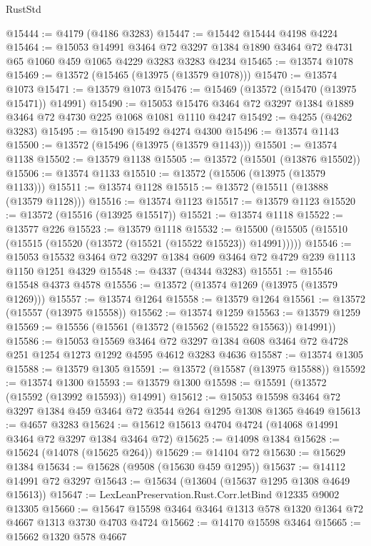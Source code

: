 \begin{lexlean}{RustStd}
\begin{coremodule}
@15444 := @4179 (@4186 @3283)
@15447 := @15442 @15444 @4198 @4224
@15464 := @15053
    @14991
    @3464
    @72
    @3297
    @1384
    @1890
    @3464
    @72
    @4731
    @65
    @1060
    @459
    @1065
    @4229
    @3283
    @3283
    @4234
@15465 := @13574 @1078
@15469 := @13572 (@15465 (@13975 (@13579 @1078)))
@15470 := @13574 @1073
@15471 := @13579 @1073
@15476 := @15469 (@13572 (@15470 (@13975 @15471)) @14991)
@15490 := @15053 @15476 @3464 @72 @3297 @1384 @1889 @3464 @72 @4730 @225 @1068 @1081 @1110 @4247
@15492 := @4255 (@4262 @3283)
@15495 := @15490 @15492 @4274 @4300
@15496 := @13574 @1143
@15500 := @13572 (@15496 (@13975 (@13579 @1143)))
@15501 := @13574 @1138
@15502 := @13579 @1138
@15505 := @13572 (@15501 (@13876 @15502))
@15506 := @13574 @1133
@15510 := @13572 (@15506 (@13975 (@13579 @1133)))
@15511 := @13574 @1128
@15515 := @13572 (@15511 (@13888 (@13579 @1128)))
@15516 := @13574 @1123
@15517 := @13579 @1123
@15520 := @13572 (@15516 (@13925 @15517))
@15521 := @13574 @1118
@15522 := @13577 @226
@15523 := @13579 @1118
@15532 := @15500 (@15505 (@15510 (@15515 (@15520 (@13572 (@15521 (@15522 @15523)) @14991)))))
@15546 := @15053 @15532 @3464 @72 @3297 @1384 @609 @3464 @72 @4729 @239 @1113 @1150 @1251 @4329
@15548 := @4337 (@4344 @3283)
@15551 := @15546 @15548 @4373 @4578
@15556 := @13572 (@13574 @1269 (@13975 (@13579 @1269)))
@15557 := @13574 @1264
@15558 := @13579 @1264
@15561 := @13572 (@15557 (@13975 @15558))
@15562 := @13574 @1259
@15563 := @13579 @1259
@15569 := @15556 (@15561 (@13572 (@15562 (@15522 @15563)) @14991))
@15586 := @15053
    @15569
    @3464
    @72
    @3297
    @1384
    @608
    @3464
    @72
    @4728
    @251
    @1254
    @1273
    @1292
    @4595
    @4612
    @3283
    @4636
@15587 := @13574 @1305
@15588 := @13579 @1305
@15591 := @13572 (@15587 (@13975 @15588))
@15592 := @13574 @1300
@15593 := @13579 @1300
@15598 := @15591 (@13572 (@15592 (@13992 @15593)) @14991)
@15612 := @15053 @15598 @3464 @72 @3297 @1384 @459 @3464 @72 @3544 @264 @1295 @1308 @1365 @4649
@15613 := @4657 @3283
@15624 := @15612 @15613 @4704 @4724 (@14068 @14991 @3464 @72 @3297 @1384 @3464 @72)
@15625 := @14098 @1384
@15628 := @15624 (@14078 (@15625 @264))
@15629 := @14104 @72
@15630 := @15629 @1384
@15634 := @15628 (@9508 (@15630 @459 @1295))
@15637 := @14112 @14991 @72 @3297
@15643 := @15634 (@13604 (@15637 @1295 @1308 @4649 @15613))
@15647 := LexLeanPreservation.Rust.Corr.letBind @12335 @9002 @13305
@15660 := @15647 @15598 @3464 @3464 @1313 @578 @1320 @1364 @72 @4667 @1313 @3730 @4703 @4724
@15662 := @14170 @15598 @3464
@15665 := @15662 @1320 @578 @4667

\end{coremodule}
\end{lexlean}
